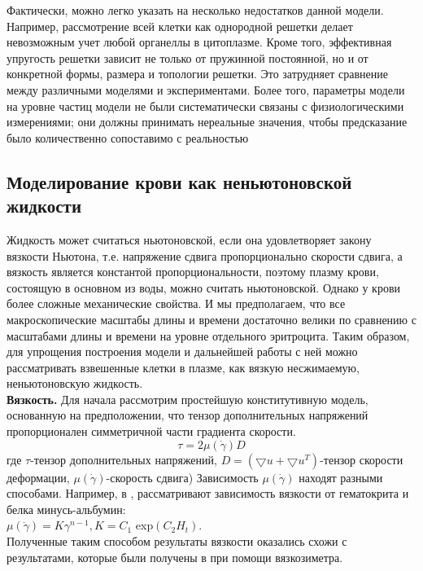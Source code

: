 \documentclass[a4paper, 14pt]{article}
\begin{document}
Фактически, можно легко указать на несколько недостатков данной модели. Например, рассмотрение всей клетки как однородной решетки делает невозможным учет любой органеллы в цитоплазме. Кроме того, эффективная упругость решетки зависит не только от пружинной постоянной, но и от конкретной формы, размера и топологии решетки. Это затрудняет сравнение между различными моделями и экспериментами. Более того, параметры модели на уровне частиц  модели не были систематически связаны с физиологическими измерениями; они должны принимать нереальные значения, чтобы предсказание было количественно сопоставимо с реальностью 


\subsection{Моделирование крови как неньютоновской жидкости}
Жидкость может считаться ньютоновской, если она удовлетворяет закону вязкости Ньютона, т.е. напряжение сдвига пропорционально скорости сдвига, а вязкость является константой пропорциональности, поэтому плазму крови, состоящую в основном из воды, можно считать ньютоновской. Однако у крови более сложные механические свойства. И мы предполагаем, что все макроскопические масштабы длины и времени достаточно велики по сравнению с масштабами длины и времени на уровне отдельного эритроцита. Таким образом, для упрощения построения модели и дальнейшей работы с ней можно рассматривать взвешенные клетки в плазме, как вязкую несжимаемую, неньютоновскую жидкость.\\

\textbf{Вязкость.}
Для начала рассмотрим простейшую конститутивную модель, основанную на предположении, что тензор дополнительных напряжений пропорционален
симметричной части градиента скорости.\\
$$\tau=2\mu (\dot{\gamma})D$$
где $\tau $-тензор дополнительных напряжений, $D=(\bigtriangledown u+\bigtriangledown u^T)$-тензор скорости деформации, $\mu (\dot{\gamma})$-скорость сдвига)
Зависимость $\mu (\dot{\gamma})$ находят разными способами. Например, в \cite{walburn:1976},   рассматривают зависимость вязкости от гематокрита и белка минусь-альбумин: \\
$\mu (\dot{\gamma})=K{\gamma}^{n-1},  K=C_1$ exp$(C_2 H_t).$\\
Полученные таким способом результаты вязкости оказались схожи с результатами, которые были получены в \cite{kim:2000} при помощи вязкозиметра.\\
\end{document}
